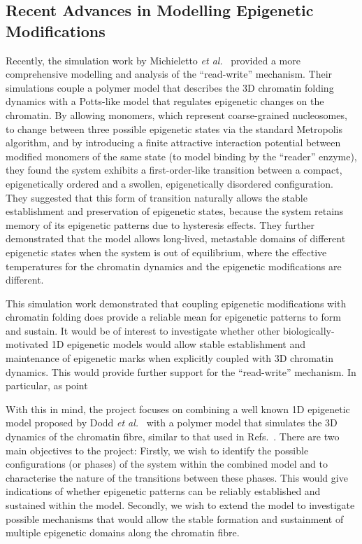 \documentclass[12pt]{article}
\newcommand{\etal}{\emph{et al.}}
\begin{document}
\subsection{Recent Advances in Modelling Epigenetic Modifications}
Recently, the simulation work by Michieletto \etal~\cite{michieletto2016} provided a more comprehensive modelling and analysis of the ``read-write'' mechanism. Their simulations couple a polymer model that describes the 3D chromatin folding dynamics with a Potts-like model that regulates epigenetic changes on the chromatin.  By allowing monomers, which represent coarse-grained nucleosomes, to change between three possible epigenetic states via the standard Metropolis algorithm, and by introducing a finite attractive interaction potential between modified monomers of the same state (to model binding by the ``reader'' enzyme), they found the system exhibits a first-order-like transition between a compact, epigenetically ordered and a swollen, epigenetically disordered configuration. They suggested that this form of transition naturally allows the stable establishment and preservation of epigenetic states, because the system retains memory of its epigenetic patterns due to hysteresis effects. They further demonstrated that the model allows long-lived, metastable domains of different epigenetic states when the system is out of equilibrium, where the effective temperatures for the chromatin dynamics and the epigenetic modifications are different. 

This simulation work demonstrated that coupling epigenetic modifications with chromatin folding does provide a reliable mean for epigenetic patterns to form and sustain. It would be of interest to investigate whether other biologically-motivated 1D epigenetic models would allow stable establishment and maintenance of epigenetic marks when explicitly coupled with 3D chromatin dynamics. This would provide further support for the ``read-write'' mechanism. In particular, as point

With this in mind, the project focuses on combining a well known 1D epigenetic model proposed by Dodd \etal~\cite{dodd2007} with a polymer model that simulates the 3D dynamics of the chromatin fibre, similar to that used in Refs.~\cite{brackley2013, michieletto2016}. There are two main objectives to the project: Firstly, we wish to identify the possible configurations (or phases) of the system within the combined model and to characterise the nature of the transitions between these phases. This would give indications of whether epigenetic patterns can be reliably established and sustained within the model. Secondly, we wish to extend the model to investigate possible mechanisms that would allow the stable formation and sustainment of multiple epigenetic domains along the chromatin fibre. 
\pagebreak
\end{document}
